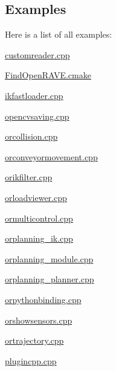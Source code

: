 \subsection{Examples}
Here is a list of all examples:\begin{DoxyCompactItemize}
\item 
\hyperlink{customreader.cpp-example}{customreader.cpp}
\item 
\hyperlink{FindOpenRAVE.cmake-example}{FindOpenRAVE.cmake}
\item 
\hyperlink{ikfastloader.cpp-example}{ikfastloader.cpp}
\item 
\hyperlink{opencvsaving.cpp-example}{opencvsaving.cpp}
\item 
\hyperlink{orcollision.cpp-example}{orcollision.cpp}
\item 
\hyperlink{orconveyormovement.cpp-example}{orconveyormovement.cpp}
\item 
\hyperlink{orikfilter.cpp-example}{orikfilter.cpp}
\item 
\hyperlink{orloadviewer.cpp-example}{orloadviewer.cpp}
\item 
\hyperlink{ormulticontrol.cpp-example}{ormulticontrol.cpp}
\item 
\hyperlink{orplanning__ik.cpp-example}{orplanning\_\-ik.cpp}
\item 
\hyperlink{orplanning__module.cpp-example}{orplanning\_\-module.cpp}
\item 
\hyperlink{orplanning__planner.cpp-example}{orplanning\_\-planner.cpp}
\item 
\hyperlink{orpythonbinding.cpp-example}{orpythonbinding.cpp}
\item 
\hyperlink{orshowsensors.cpp-example}{orshowsensors.cpp}
\item 
\hyperlink{ortrajectory.cpp-example}{ortrajectory.cpp}
\item 
\hyperlink{plugincpp.cpp-example}{plugincpp.cpp}
\end{DoxyCompactItemize}
